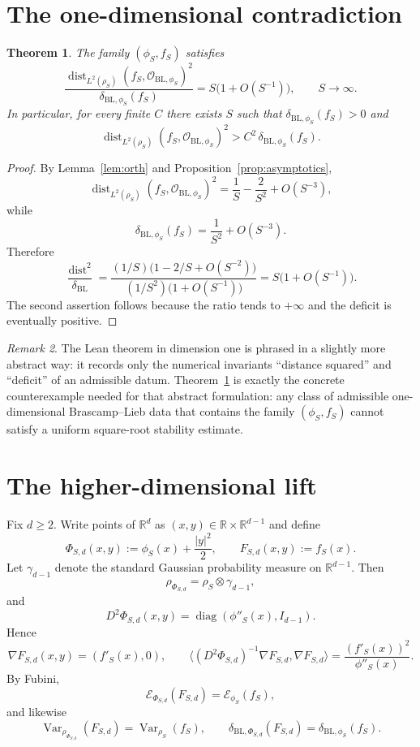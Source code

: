 \documentclass[11pt]{amsart}
\newtheorem{theorem}{Theorem}[section]
\theoremstyle{remark}
\newtheorem{remark}[theorem]{Remark}
\DeclareMathOperator{\Var}{Var}
\DeclareMathOperator{\dist}{dist}
\DeclareMathOperator{\diag}{diag}
\newcommand{\R}{\mathbb R}
\newcommand{\cO}{\mathcal O}
\newcommand{\BL}{\mathrm{BL}}
\begin{document}
\section{The one-dimensional contradiction}

\begin{theorem}\label{thm:1d}
The family $(\phi_S,f_S)$ satisfies
\[
  \frac{\dist_{L^2(\rho_S)}(f_S,\cO_{\BL,\phi_S})^2}
       {\delta_{\BL,\phi_S}(f_S)}
  =
  S\bigl(1+O(S^{-1})\bigr),
  \qquad S\to\infty.
\]
In particular, for every finite $C$ there exists $S$ such that
$\delta_{\BL,\phi_S}(f_S)>0$ and
\[
  \dist_{L^2(\rho_S)}(f_S,\cO_{\BL,\phi_S})^2
  >
  C^2\,\delta_{\BL,\phi_S}(f_S).
\]
\end{theorem}

\begin{proof}
By Lemma~\ref{lem:orth} and Proposition~\ref{prop:asymptotics},
\[
  \dist_{L^2(\rho_S)}(f_S,\cO_{\BL,\phi_S})^2
  =
  \frac{1}{S}-\frac{2}{S^2}+O(S^{-3}),
\]
while
\[
  \delta_{\BL,\phi_S}(f_S)=\frac{1}{S^2}+O(S^{-3}).
\]
Therefore
\[
  \frac{\dist^2}{\delta_{\BL}}
  =
  \frac{(1/S)\bigl(1-2/S+O(S^{-2})\bigr)}
       {(1/S^2)\bigl(1+O(S^{-1})\bigr)}
  =
  S\bigl(1+O(S^{-1})\bigr).
\]
The second assertion follows because the ratio tends to $+\infty$ and the
deficit is eventually positive.
\end{proof}

\begin{remark}\label{rem:lean-1d}
The Lean theorem in dimension one is phrased in a slightly more abstract way:
it records only the numerical invariants ``distance squared'' and ``deficit''
of an admissible datum. Theorem~\ref{thm:1d} is exactly the concrete
counterexample needed for that abstract formulation: any class of admissible
one-dimensional Brascamp--Lieb data that contains the family $(\phi_S,f_S)$
cannot satisfy a uniform square-root stability estimate.
\end{remark}

\section{The higher-dimensional lift}

Fix $d\ge 2$. Write points of $\R^d$ as $(x,y)\in \R\times\R^{d-1}$ and define
\[
  \Phi_{S,d}(x,y):=\phi_S(x)+\frac{|y|^2}{2},
  \qquad
  F_{S,d}(x,y):=f_S(x).
\]
Let $\gamma_{d-1}$ denote the standard Gaussian probability measure on
$\R^{d-1}$. Then
\[
  \rho_{\Phi_{S,d}}=\rho_S\otimes\gamma_{d-1},
\]
and
\[
  D^2\Phi_{S,d}(x,y)=\diag(\phi''_S(x),I_{d-1}).
\]
Hence
\[
  \nabla F_{S,d}(x,y)=(f'_S(x),0),
  \qquad
  \langle (D^2\Phi_{S,d})^{-1}\nabla F_{S,d},\nabla F_{S,d}\rangle
  =\frac{(f'_S(x))^2}{\phi''_S(x)}.
\]
By Fubini,
\begin{equation}\label{eq:prod-energy}
  \mathcal E_{\Phi_{S,d}}(F_{S,d})=\mathcal E_{\phi_S}(f_S),
\end{equation}
and likewise
\begin{equation}\label{eq:prod-var}
  \Var_{\rho_{\Phi_{S,d}}}(F_{S,d})=\Var_{\rho_S}(f_S),
  \qquad
  \delta_{\BL,\Phi_{S,d}}(F_{S,d})=\delta_{\BL,\phi_S}(f_S).
\end{equation}
\end{document}
